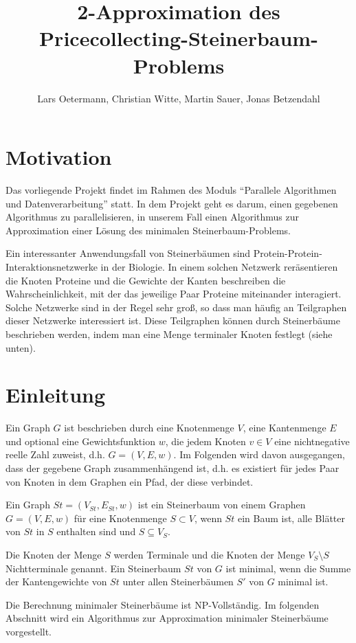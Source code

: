 \documentclass[a4paper,10pt]{article}
\title{2-Approximation des Pricecollecting-Steinerbaum-Problems}
\author{Lars Oetermann, Christian Witte, Martin Sauer, Jonas Betzendahl}
\begin{document}
\maketitle

\section{Motivation}
Das vorliegende Projekt findet im Rahmen des Moduls ``Parallele Algorithmen und Datenverarbeitung'' statt. In dem Projekt geht es darum, einen gegebenen
Algorithmus zu parallelisieren, in unserem Fall einen Algorithmus zur Approximation einer Lösung des minimalen Steinerbaum-Problems.

Ein interessanter Anwendungsfall von Steinerbäumen sind Protein-Protein-Interaktionsnetzwerke in der Biologie. In einem solchen Netzwerk
reräsentieren die Knoten Proteine und die Gewichte der Kanten beschreiben die Wahrscheinlichkeit, mit der das jeweilige Paar Proteine miteinander
interagiert. Solche Netzwerke sind in der Regel sehr groß, so dass man häufig an Teilgraphen dieser Netzwerke interessiert ist.
Diese Teilgraphen können durch Steinerbäume beschrieben werden, indem man eine Menge terminaler Knoten festlegt (siehe unten).


\section{Einleitung}
Ein Graph $G$ ist beschrieben durch eine Knotenmenge $V$, eine Kantenmenge $E$ und optional eine Gewichtsfunktion $w$, die jedem Knoten $v \in V$
eine nichtnegative reelle Zahl zuweist, d.h. $G = (V,E,w)$. Im Folgenden wird davon ausgegangen, dass der gegebene Graph zusammenhängend ist,
d.h. es existiert für jedes Paar von Knoten in dem Graphen ein Pfad, der diese verbindet.

Ein Graph $St = (V_{St}, E_{St}, w)$ ist ein Steinerbaum von einem Graphen $G = (V, E, w)$ für eine Knotenmenge $S \subset V$, wenn $St$ ein Baum ist, alle Blätter von $St$ in $S$ enthalten sind und $S \subseteq V_S$\cite{steinerProblem}. 

Die Knoten der Menge $S$ werden Terminale und die Knoten der Menge
$V_S \setminus S$ Nichtterminale genannt. Ein Steinerbaum $St$ von $G$ ist minimal, wenn die Summe der Kantengewichte von $St$ unter allen Steinerbäumen $S'$ von $G$ minimal ist.
\smallskip

Die Berechnung minimaler Steinerbäume ist NP-Vollständig. Im folgenden Abschnitt wird ein Algorithmus zur Approximation minimaler Steinerbäume vorgestellt.
\end{document}
